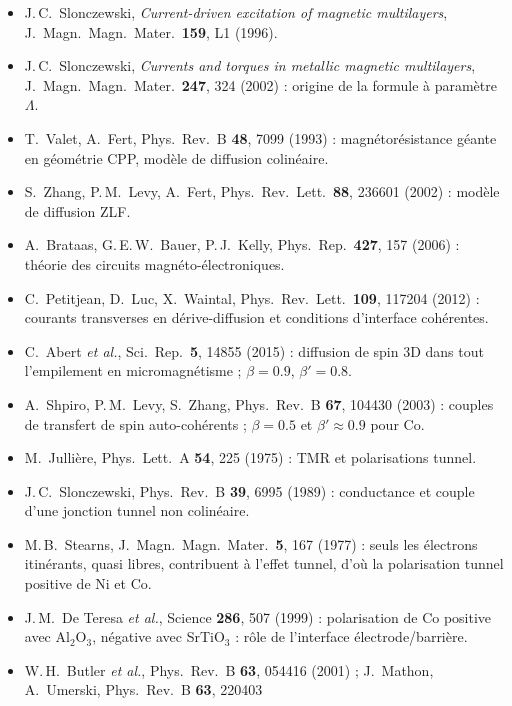 \documentclass[11pt,a4paper]{article}
\begin{document}
\begin{itemize}
  \item J.\,C.~Slonczewski, \emph{Current-driven excitation of magnetic
    multilayers}, J.~Magn.\ Magn.\ Mater.\ \textbf{159}, L1 (1996).
  \item J.\,C.~Slonczewski, \emph{Currents and torques in metallic magnetic
    multilayers}, J.~Magn.\ Magn.\ Mater.\ \textbf{247}, 324 (2002) :
    origine de la formule à paramètre $\Lambda$.
  \item T.~Valet, A.~Fert, Phys.\ Rev.\ B \textbf{48}, 7099 (1993) :
    magnétorésistance géante en géométrie CPP, modèle de diffusion
    colinéaire.
  \item S.~Zhang, P.\,M.~Levy, A.~Fert, Phys.\ Rev.\ Lett.\ \textbf{88},
    236601 (2002) : modèle de diffusion ZLF.
  \item A.~Brataas, G.\,E.\,W.~Bauer, P.\,J.~Kelly, Phys.\ Rep.\
    \textbf{427}, 157 (2006) : théorie des circuits magnéto-électroniques.
  \item C.~Petitjean, D.~Luc, X.~Waintal, Phys.\ Rev.\ Lett.\
    \textbf{109}, 117204 (2012) : courants transverses en dérive-diffusion
    et conditions d'interface cohérentes.
  \item C.~Abert \emph{et al.}, Sci.\ Rep.\ \textbf{5}, 14855 (2015) :
    diffusion de spin 3D dans tout l'empilement en micromagnétisme ;
    $\beta = 0.9$, $\beta' = 0.8$.
  \item A.~Shpiro, P.\,M.~Levy, S.~Zhang, Phys.\ Rev.\ B \textbf{67},
    104430 (2003) : couples de transfert de spin auto-cohérents ;
    $\beta = 0.5$ et $\beta'\approx0.9$ pour Co.
  \item M.~Jullière, Phys.\ Lett.\ A \textbf{54}, 225 (1975) : TMR et
    polarisations tunnel.
  \item J.\,C.~Slonczewski, Phys.\ Rev.\ B \textbf{39}, 6995 (1989) :
    conductance et couple d'une jonction tunnel non colinéaire.
  \item M.\,B.~Stearns, J.~Magn.\ Magn.\ Mater.\ \textbf{5}, 167 (1977) :
    seuls les électrons itinérants, quasi libres, contribuent à l'effet
    tunnel, d'où la polarisation tunnel positive de Ni et Co.
  \item J.\,M.~De Teresa \emph{et al.}, Science \textbf{286}, 507 (1999) :
    polarisation de Co positive avec Al$_2$O$_3$, négative avec SrTiO$_3$ :
    rôle de l'interface électrode/barrière.
  \item W.\,H.~Butler \emph{et al.}, Phys.\ Rev.\ B \textbf{63}, 054416
    (2001) ; J.~Mathon, A.~Umerski, Phys.\ Rev.\ B \textbf{63}, 220403

\end{itemize}
\end{document}
